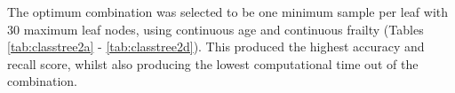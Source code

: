 \documentclass[../thesis.tex]{subfiles}
\begin{document}
The optimum combination was selected to be one minimum sample per leaf with 30 maximum leaf nodes, using continuous age and continuous frailty (Tables \ref{tab:classtree2a} - \ref{tab:classtree2d}). This produced the highest accuracy and recall score, whilst also producing the lowest computational time out of the combination.

\begin{table}[h!]
\begin{subtable}{.49\linewidth}
    \centering{}
    \caption{Accuracy Score}
    \label{tab:classtree1a}
    \end{subtable}
\begin{subtable}{.5\linewidth}
  

\end{subtable}
\end{table}
\end{document}
